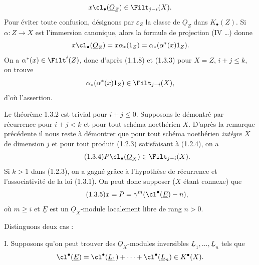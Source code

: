 
\[
x\cl_\bullet(\underline{O}_Z)\in\Filt_{j-i}(X).
\]
Pour éviter toute confusion, désignons par $\varepsilon_Z$ la classe de $\underline{O}_Z$ dans $K_\bullet(Z)$. Si $\alpha:Z\to X$ est l'immersion canonique, alors la formule de projection (IV \ldots) donne
\[
x\cl_\bullet(\underline{O}_Z)=x\alpha_*(1_Z)=\alpha_*(\alpha^*(x)1_Z).
\]
On a $\alpha^*(x)\in\Filt^i(Z)$, donc d'après (1.1.8) et (1.3.3) pour $X=Z$, $i+j\leq k$, on trouve
\[
\alpha_*(\alpha^*(x)1_Z)\in\Filt_{j-i}(X),
\]
d'où l'assertion.

Le théorème 1.3.2 est trivial pour $i+j\leq0$. Supposons le démontré par récurrence pour $i+j<k$ et pour tout schéma noethérien $X$. D'après la remarque précédente il nous reste à démontrer que pour tout schéma noethérien \emph{intègre} $X$ de dimension $j$ et pour tout produit (1.2.3) satisfaisant à (1.2.4), on a
\begin{equation}\tag{1.3.4}
P\cl_\bullet(\underline{O}_X)\in\Filt_{j-i}(X).
\end{equation}
Si $k>1$ dans (1.2.3), on a gagné grâce à l'hypothèse de récurrence et l'associativité de la loi (1.3.1). On peut donc supposer ($X$ étant connexe) que
\begin{equation}\tag{1.3.5}
x=P=\gamma^m(\cl^{\bullet}(\underline{E})-n),
\end{equation}
où $m\geq i$ et $\underline{E}$ est un $\underline{O}_X$-module localement libre de rang $n>0$.

Distinguons deux cas :

I. Supposons qu'on peut trouver des $\underline{O}_X$-modules inversibles $\underline{L}_1,\ldots,\underline{L}_n$ tels que
\[
\cl^{\bullet}(\underline{E})=\cl^{\bullet}(\underline{L}_1)+\cdots+\cl^{\bullet}(\underline{L}_n)\in K^{\bullet}(X).
\]
